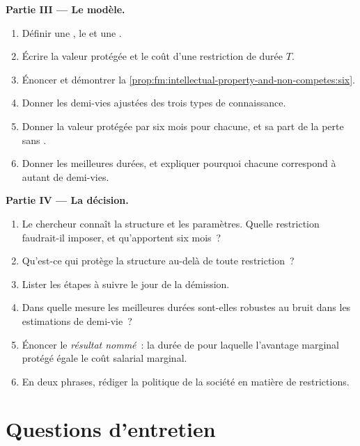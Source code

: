 \begin{problem}
\medskip\noindent\textbf{Partie III --- Le modèle.}
\begin{enumerate}[resume]
\item Définir une , le  et une .
\item Écrire la valeur protégée et le coût d'une restriction de durée $T$.
\item Énoncer et démontrer la \cref{prop:fm:intellectual-property-and-non-competes:six}.
\item Donner les demi-vies ajustées des trois types de connaissance.
\item Donner la valeur protégée par six mois pour chacune, et sa part de la perte sans .
\item Donner les meilleures durées, et expliquer pourquoi chacune correspond à autant de demi-vies.
\end{enumerate}

\medskip\noindent\textbf{Partie IV --- La décision.}
\begin{enumerate}[resume]
\item Le chercheur connaît la structure et les paramètres. Quelle restriction faudrait-il imposer, et qu'apportent six mois~?
\item Qu'est-ce qui protège la structure au-delà de toute restriction~?
\item Lister les étapes à suivre le jour de la démission.
\item Dans quelle mesure les meilleures durées sont-elles robustes au bruit dans les estimations de demi-vie~?
\item Énoncer le \emph{résultat nommé}~: la durée de  pour laquelle l'avantage marginal protégé égale le coût salarial marginal.
\item En deux phrases, rédiger la politique de la société en matière de restrictions.
\end{enumerate}
\end{problem}

\section{Questions d'entretien}

